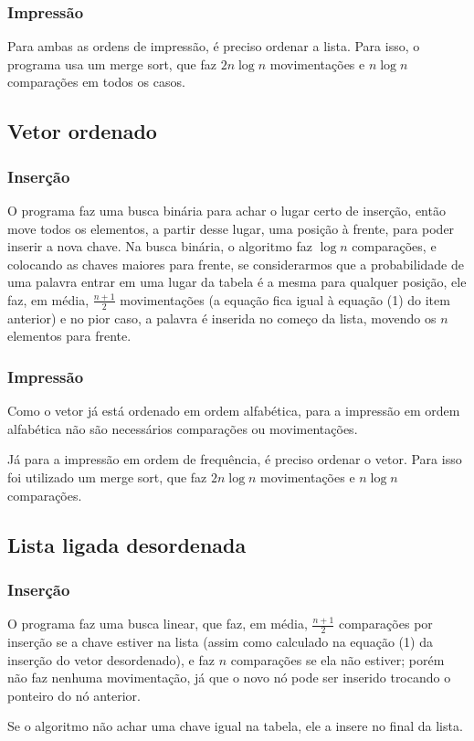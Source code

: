 \documentclass[12pt, a4paper]{article} %
\begin{document}
		\subsubsection{Impressão}
		\par Para ambas as ordens de impressão, é preciso ordenar a lista. Para isso, o programa usa um merge sort, que faz $2n\log n$ movimentações e $n\log n$ comparações em todos os casos.

	\subsection{Vetor ordenado}
		\subsubsection{Inserção}
		\par O programa faz uma busca binária para achar o lugar certo de inserção, então move todos os elementos, a partir desse lugar, uma posição à frente, para poder inserir a nova chave. Na busca binária, o algoritmo faz $\log n$ comparações, e colocando as chaves maiores para frente, se considerarmos que a probabilidade de uma palavra entrar em uma lugar da tabela é a mesma para qualquer posição, ele faz, em média, $\frac{n+1}{2}$ movimentações (a equação fica igual à equação (1) do item anterior) e no pior caso, a palavra é inserida no começo da lista, movendo os $n$ elementos para frente.
		\subsubsection{Impressão}
		\par Como o vetor já está ordenado em ordem alfabética, para a impressão em ordem alfabética não são necessários comparações ou movimentações.
		\par Já para a impressão em ordem de frequência, é preciso ordenar o vetor. Para isso foi utilizado um merge sort, que faz $2n\log n$ movimentações e $n\log n$ comparações.

	\subsection{Lista ligada desordenada}
		\subsubsection{Inserção}
		\par O programa faz uma busca linear, que faz, em média, $\frac{n+1}{2}$ comparações por inserção se a chave estiver na lista (assim como calculado na equação (1) da inserção do vetor desordenado), e faz $n$ comparações se ela não estiver; porém não faz nenhuma movimentação, já que o novo nó pode ser inserido trocando o ponteiro do nó anterior.
		\par Se o algoritmo não achar uma chave igual na tabela, ele a insere no final da lista.
\end{document}
